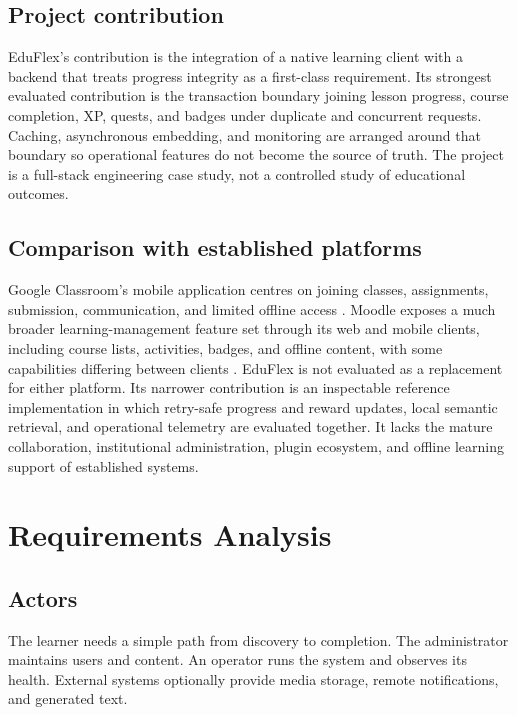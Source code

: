 \documentclass[12pt,a4paper,oneside]{report}
\begin{document}
\section{Project contribution}
EduFlex's contribution is the integration of a native learning client with a backend
that treats progress integrity as a first-class requirement. Its strongest evaluated
contribution is the transaction boundary joining lesson progress, course completion,
XP, quests, and badges under duplicate and concurrent requests. Caching, asynchronous
embedding, and monitoring are arranged around that boundary so operational features do
not become the source of truth. The project is a full-stack engineering case study,
not a controlled study of educational outcomes.

\section{Comparison with established platforms}
Google Classroom's mobile application centres on joining classes, assignments,
submission, communication, and limited offline access \cite{googleclassroommobile}.
Moodle exposes a much broader learning-management feature set through its web and
mobile clients, including course lists, activities, badges, and offline content, with
some capabilities differing between clients \cite{moodlemobilefeatures}. EduFlex is
not evaluated as a replacement for either platform. Its narrower contribution is an
inspectable reference implementation in which retry-safe progress and reward updates,
local semantic retrieval, and operational telemetry are evaluated together. It lacks
the mature collaboration, institutional administration, plugin ecosystem, and offline
learning support of established systems.

\chapter{Requirements Analysis}
\section{Actors}
The learner needs a simple path from discovery to completion. The administrator
maintains users and content. An operator runs the system and observes its health.
External systems optionally provide media storage, remote notifications, and
generated text.
\end{document}
